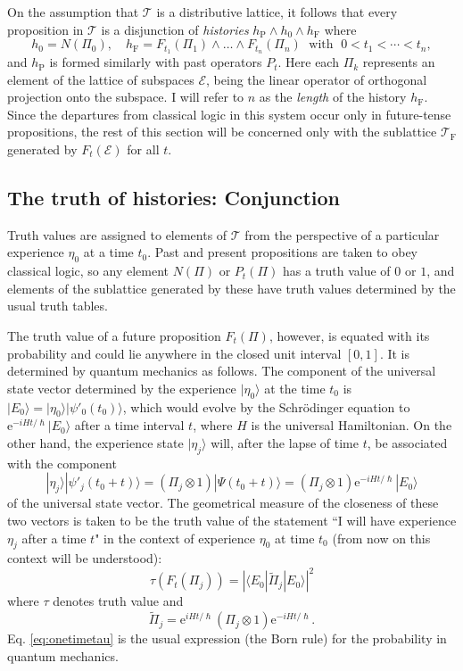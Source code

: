 \documentclass[12pt,reqno]{article}
\renewcommand{\(}{\left(}
\renewcommand{\)}{\right)}
\newcommand{\e}{\mbox{e}}
\renewcommand{\hbar}{\hslash}
\newcommand{\E}{\mathcal{E}}
\newcommand{\T}{\mathcal{T}}
\newcommand{\TF}{\mathcal{T}_\text{F}}
\newcommand{\<}{\langle}
\renewcommand{\>}{\rangle}
\newcommand{\be}{\begin{equation}}
\newcommand{\ee}{\end{equation}}
\newcommand{\Pii}{\widetilde{\Pi}}
\theoremstyle{plain} %
\begin{document}
On the assumption that $\T$ is a distributive lattice, it follows that every proposition in $\T$ is a disjunction of \emph{histories} $h_\text{P}\land h_0 \land h_\text{F}$ where
\be\label{history}
h_0 = N(\Pi_0), \quad h_\text{F} = F_{t_1}(\Pi_1)\land \ldots \land F_{t_n}(\Pi_n) \; \text{ with } \; 0 < t_1 < \cdots < t_n,
\ee
and $h_\text{P}$ is formed similarly with past operators $P_t$. Here each $\Pi_k$ represents an element of the lattice of subspaces $\E$, being the linear operator of orthogonal projection onto the subspace. I will refer to $n$ as the \emph{length} of the history $h_\text{F}$. Since the departures from classical logic in this system occur only in future-tense propositions, the rest of this section will be concerned only with the sublattice $\TF$ generated by $F_t(\E)$ for all $t$.

\subsection{The truth of histories: Conjunction}
\label{subsec:truth}

Truth values are assigned to elements of $\T$ from the perspective of a particular experience $\eta_0$ at a time $t_0$. Past and present propositions are taken to obey classical logic, so any element $N(\Pi)$ or $P_t(\Pi)$ has a truth value of $0$ or $1$, and elements of the sublattice generated by these have truth values determined by the usual truth tables. 

The truth value of a future proposition $F_t(\Pi)$, however, is equated with its probability and could lie anywhere in the closed unit interval $[0,1]$. It is determined by quantum mechanics as follows. The component of the universal state vector determined by the experience $|\eta_0\>$ at the time $t_0$ is $|E_0\> = |\eta_0\>|\psi'_0(t_0)\>$, which would evolve by the Schr\"odinger equation to $\e^{-iHt/\hbar}|E_0\>$ after a time interval $t$, where $H$ is the universal Hamiltonian. On the other hand, the experience state $|\eta_j\>$ will, after the lapse of time $t$, be associated with the component
\[
|\eta_j\>|\psi'_j(t_0 + t)\> = (\Pi_j\otimes 1)|\Psi(t_0 + t)\> = (\Pi_j\otimes 1)\e^{-iHt/\hbar}|E_0\>
\]
of the universal state vector. The geometrical measure of the closeness of these two vectors is taken to be the truth value of the statement ``I will have experience $\eta_j$ after a time $t$" in the context of experience $\eta_0$ at time $t_0$ (from now on this context will be understood):
\be\label{eq:onetimetau}
\tau\left(F_t(\Pi_j)\right) = \left|\<E_0|\Pii_j|E_0\>\right|^2
\ee
where $\tau$ denotes truth value and
\[
\Pii_j = \e^{iHt/\hbar}(\Pi_j\otimes 1)\e^{-iHt/\hbar}.
\]
Eq. \eqref{eq:onetimetau} is the usual expression (the Born rule) for the probability in quantum mechanics.
\end{document}
